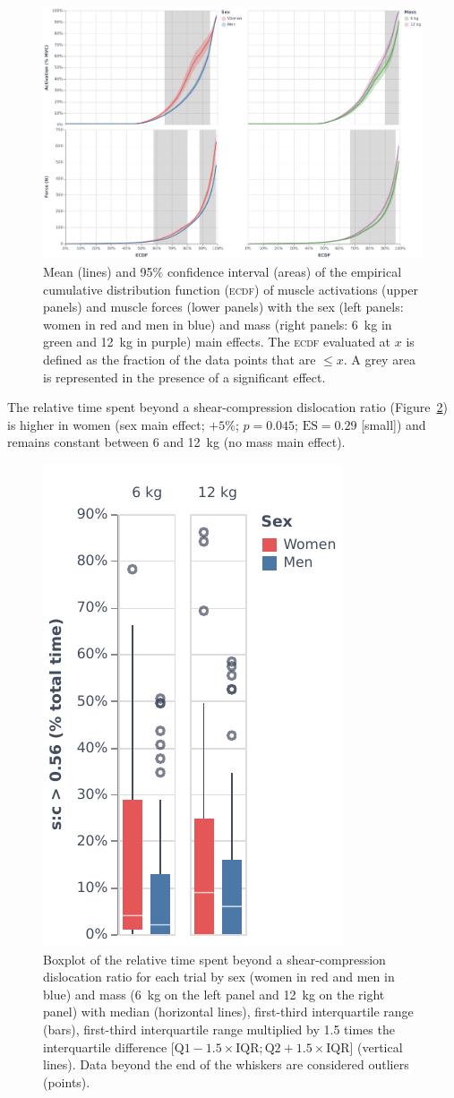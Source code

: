 \begin{figure}[H]
    \centering\includegraphics[width=1\linewidth]{fig/ecdf_effects.pdf}
    \caption{Mean (lines) and 95\% confidence interval (areas) of the empirical cumulative distribution function (\textsc{ecdf}) of muscle activations (upper panels) and muscle forces (lower panels) with the sex (left panels: women in red and men in blue) and mass (right panels: 6~kg in green and 12~kg in purple) main effects.
    The \textsc{ecdf} evaluated at $x$ is defined as the fraction of the data points that are $\leq x$.
    A grey area is represented in the presence of a significant effect.}
    \label{fig:ecdf_effects}
\end{figure}

The relative time spent beyond a shear-compression dislocation ratio (Figure~\ref{fig:dislocation}) is higher in women (sex main effect; $+5$\%; $p = 0.045$; $\textrm{ES} = 0.29$ [small]) and remains constant between 6 and 12~kg (no mass main effect).

\begin{figure}[H]
    \centering\includegraphics[width=0.3\linewidth]{fig/dislocation.pdf}
    \caption{Boxplot of the relative time spent beyond a shear-compression dislocation ratio for each trial by sex (women in red and men in blue) and mass (6~kg on the left panel and 12~kg on the right panel) with median (horizontal lines), first-third interquartile range (bars), first-third interquartile range multiplied by 1.5 times the interquartile difference [$\textrm{Q1} - 1.5 \times \textrm{IQR}; \textrm{Q2} + 1.5 \times \textrm{IQR}$] (vertical lines).
    Data beyond the end of the whiskers are considered outliers (points).}
    \label{fig:dislocation}
\end{figure}